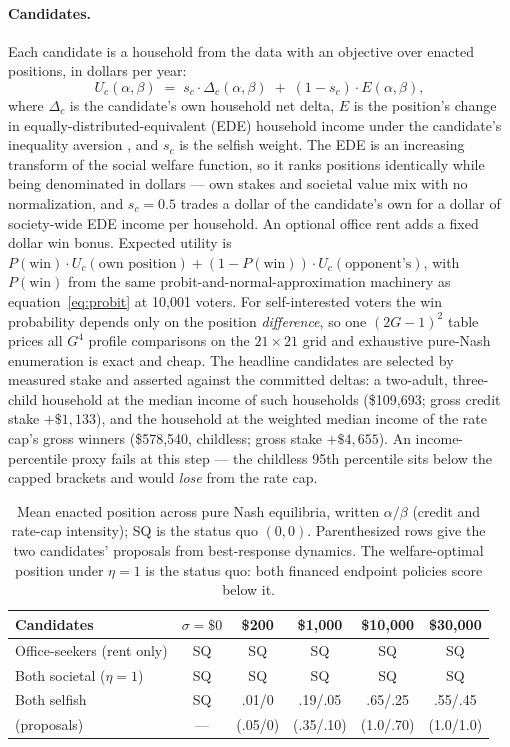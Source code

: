 \documentclass[11pt]{article}
\begin{document}
\paragraph{Candidates.} Each candidate is a household from the data with
an objective over enacted positions, in dollars per year:
\begin{equation}
U_c(\alpha, \beta) \;=\; s_c \cdot \Delta_c(\alpha, \beta)
\;+\; (1 - s_c) \cdot E(\alpha, \beta),
\label{eq:candidate}
\end{equation}
where \(\Delta_c\) is the candidate's own household net delta, \(E\) is
the position's change in equally-distributed-equivalent (EDE) household
income under the candidate's inequality aversion
\citep{atkinson1970}, and \(s_c\) is the selfish weight. The EDE is an
increasing transform of the social welfare function, so it ranks
positions identically while being denominated in dollars --- own stakes
and societal value mix with no normalization, and \(s_c = 0.5\) trades a
dollar of the candidate's own for a dollar of society-wide EDE income
per household. An optional office rent adds a fixed dollar win bonus.
Expected utility is \(P(\text{win}) \cdot U_c(\text{own position}) +
(1 - P(\text{win})) \cdot U_c(\text{opponent's})\), with \(P(\text{win})\)
from the same probit-and-normal-approximation machinery as
equation~\eqref{eq:probit} at 10{,}001 voters. For self-interested
voters the win probability depends only on the position
\emph{difference}, so one \((2G{-}1)^2\) table prices all \(G^4\)
profile comparisons on the \(21 \times 21\) grid and exhaustive
pure-Nash enumeration is exact and cheap. The headline candidates are
selected by measured stake and asserted against the committed deltas: a
two-adult, three-child household at the median income of such households
(\$109{,}693; gross credit stake \(+\$1{,}133\)), and the household at
the weighted median income of the rate cap's gross winners (\$578{,}540,
childless; gross stake \(+\$4{,}655\)). An income-percentile proxy fails
at this step --- the childless 95th percentile sits below the capped
brackets and would \emph{lose} from the rate cap.

\begin{table}[t]
\centering
\small
\begin{tabular}{lccccc}
\toprule
Candidates & \(\sigma = \$0\) & \$200 & \$1{,}000 & \$10{,}000 & \$30{,}000 \\
\midrule
Office-seekers (rent only) & SQ & SQ & SQ & SQ & SQ \\
Both societal (\(\eta = 1\)) & SQ & SQ & SQ & SQ & SQ \\
Both selfish & SQ & .01/0 & .19/.05 & .65/.25 & .55/.45 \\
\quad (proposals) & --- & (.05/0) & (.35/.10) & (1.0/.70) & (1.0/1.0) \\
\bottomrule
\end{tabular}
\caption{Mean enacted position across pure Nash equilibria, written
\(\alpha/\beta\) (credit and rate-cap intensity); SQ is the status quo
\((0,0)\). Parenthesized rows give the two candidates' proposals from
best-response dynamics. The welfare-optimal position under \(\eta = 1\)
is the status quo: both financed endpoint policies score below it.}
\label{tab:strategic}
\end{table}
\end{document}
